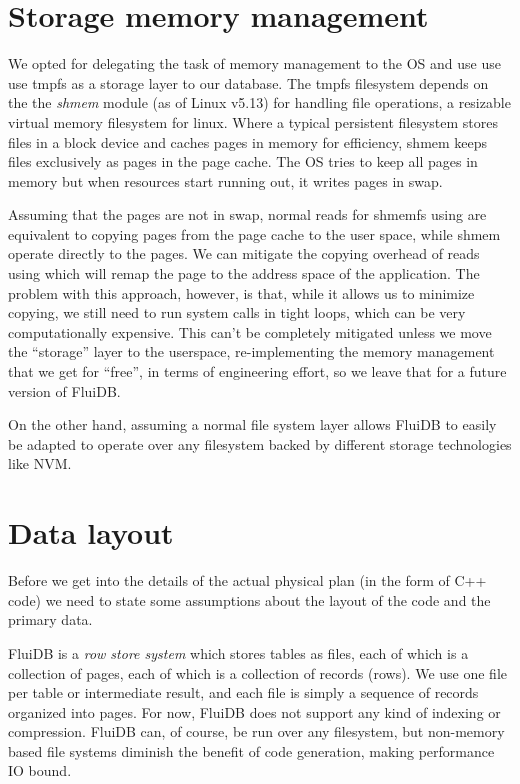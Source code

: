 \section{Storage memory management}

We opted for delegating the task of memory management to the OS and
use use use tmpfs as a storage layer to our database. The tmpfs
filesystem depends on the the \emph{shmem} module (as of Linux v5.13)
for handling file operations, a resizable virtual memory filesystem
for linux. Where a typical persistent filesystem stores files in a
block device and caches pages in memory for efficiency, shmem keeps
files exclusively as pages in the page cache. The OS tries to keep all
pages in memory but when resources start running out, it writes pages
in swap.

Assuming that the pages are not in swap, normal reads for shmemfs
using  are equivalent to copying pages from the page cache
to the user space, while shmem  operate directly to the
pages. We can mitigate the copying overhead of reads using 
which will remap the page to the address space of the application.
The problem with this approach, however, is that, while it allows us
to minimize copying, we still need to run system calls in tight loops,
which can be very computationally expensive. This can't be completely
mitigated unless we move the ``storage'' layer to the userspace,
re-implementing the memory management that we get for ``free'', in
terms of engineering effort, so we leave that for a future version of
FluiDB.

On the other hand, assuming a normal file system layer allows FluiDB
to easily be adapted to operate over any filesystem backed by
different storage technologies like NVM.

\section{Data layout}

Before we get into the details of the actual physical plan (in the
form of C++ code) we need to state some assumptions about the layout
of the code and the primary data.

FluiDB is a \emph{row store system} which stores tables as files, each
of which is a collection of pages, each of which is a collection of
records (rows). We use one file per table or intermediate result, and
each file is simply a sequence of records organized into pages. For
now, FluiDB does not support any kind of indexing or
compression. FluiDB can, of course, be run over any filesystem, but
non-memory based file systems diminish the benefit of code generation,
making performance IO bound.

